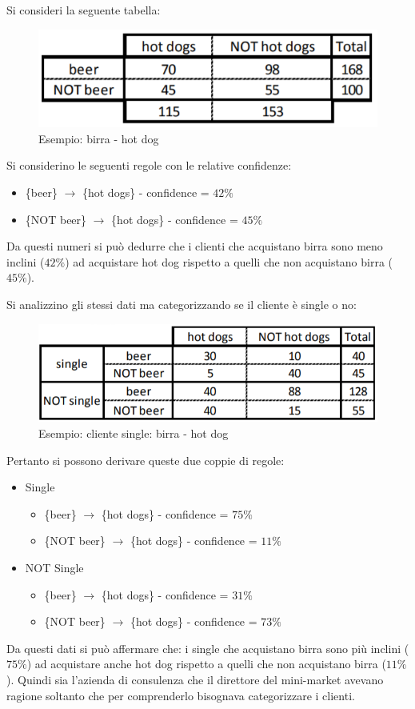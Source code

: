 Si consideri la seguente tabella:
\begin{figure}[H]
	\centering
	\includegraphics[height=0.2 \linewidth]{association/pict/beer_hotdog.png}
	\caption{Esempio: birra - hot dog}
\end{figure}
Si considerino le seguenti regole con le relative confidenze:
\begin{itemize}
	\item \{beer\} $\rightarrow$ \{hot dogs\} - confidence = $42\%$
	\item \{NOT beer\} $\rightarrow$ \{hot dogs\} - confidence = $45\%$
\end{itemize}	
Da questi numeri si può dedurre che i clienti che acquistano birra sono meno inclini ($42\%$) ad acquistare hot dog rispetto a quelli che non acquistano birra ($45\%$).

Si analizzino gli stessi dati ma categorizzando se il cliente è single o no:
\begin{figure}[H]
	\centering
	\includegraphics[height=0.2 \linewidth]{association/pict/beer_hotdog_single.png}
	\caption{Esempio: cliente single: birra - hot dog}
\end{figure}
Pertanto si possono derivare queste due coppie di regole:
\begin{itemize}
	\item Single
	\begin{itemize}
		\item \{beer\} $\rightarrow$ \{hot dogs\} - confidence = $75\%$
		\item \{NOT beer\} $\rightarrow$ \{hot dogs\} - confidence = $11\%$
	\end{itemize}
	\item NOT Single
	\begin{itemize}
		\item \{beer\} $\rightarrow$ \{hot dogs\} - confidence = $31\%$
		\item \{NOT beer\} $\rightarrow$ \{hot dogs\} - confidence = $73\%$
	\end{itemize}
\end{itemize}
Da questi dati si può affermare che: i single che acquistano birra sono più inclini ($75\%$) ad acquistare anche hot dog rispetto a quelli che non acquistano birra ($11\%$).
Quindi sia l'azienda di consulenza che il direttore del mini-market avevano ragione soltanto che per comprenderlo bisognava categorizzare i clienti. 

